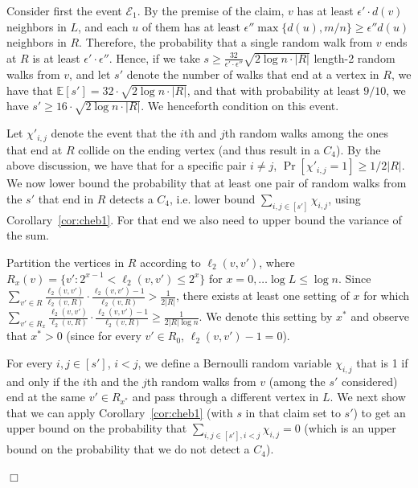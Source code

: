 \documentclass{article}
\newcommand{\eps}{\epsilon}
\newcommand{\Ex}{\mathbb{E}}
\newenvironment{proof}{\smallskip\noindent{\bf Proof:}}%
        {\hspace*{\fill}$\Box$\par}
\begin{document}
\begin{proof}
Consider first the event $\mathcal{E}_1$.
By the premise of the claim, $v$ has at least $\eps'\cdot d(v)$ neighbors in $L$, and each $u$ of them has at least $\eps'' \max\{d(u), m/n\}\geq \eps'' d(u)$ neighbors in $R$. Therefore, 
the probability that a single random walk from $v$ ends at $R$ is at least $\eps'\cdot \eps''$. 
Hence, if we take $s\geq  \frac{32}{\eps' \cdot \eps''}\sqrt{2\log n \cdot |R|}$ length-2 random walks from $v$, and let $s'$ denote the number of  walks that end at a vertex in $R$,  we have that $\Ex[s']=32\cdot \sqrt{2\log n \cdot |R|}$, and that with probability at least $9/10$, we have $s' \geq 16\cdot \sqrt{2\log n \cdot |R|}$. We henceforth condition on this event. 

 Let $\chi'_{i,j}$ denote the event that the $i$th and $j$th random walks among the ones that end at $R$ collide on the ending vertex (and thus result in a $C_4$). By the above discussion, we have that for a specific pair $i\neq j$, $\Pr[\chi'_{i,j}=1]\geq 1/2|R|$. We now  lower bound the probability that at least one pair of random walks from the $s'$ that end in $R$ detects a $C_4$, i.e. lower bound $\sum_{i,j\in[s']}\chi_{i,j}$,  using Corollary~\ref{cor:cheb1}. For that end  we also need to upper bound the variance of the sum. 
 
 Partition the vertices in $R$ according to $\ell_2(v,v')$, where $R_x(v) = \{v': 2^{x-1} < \ell_2(v,v') \leq 2^x\}$
for $x = 0, \dots \log L \leq \log n$.
Since $\sum_{v'\in R} \frac{\ell_2(v,v')}{\ell_2(v,R)}\cdot   \frac{\ell_2(v,v')-1}{\ell_2(v,R)}>\frac{1}{2|R|}$,  there exists at least one setting of $x$ for which
$\sum_{v'\in R_x} \frac{\ell_2(v,v')}{\ell_2(v,R)}\cdot   \frac{\ell_2(v,v')-1}{\ell_2(v,R)} \geq \frac{1}{2|R|\log n}$. We denote this setting by $x^*$ and observe that $x^* > 0$ (since for every $v'\in R_0$, $\ell_2(v,v')-1 =0$).

For every $i,j \in [s']$, $i<j$, we define a Bernoulli random variable $\chi_{i,j}$ that is 1 if and only if the $i$th and the $j$th random walks from $v$ (among the $s'$ considered) end at the same $v'\in R_{x^*}$ and pass through a different vertex in $L$. We next show that we can apply Corollary~\ref{cor:cheb1} (with $s$ in that claim set to $s'$) to get an upper bound on the probability that $\sum_{i,j \in [s'], i<j} \chi_{i,j} = 0$ (which is an upper bound on the probability that we do not detect a $C_4$).


\end{proof}
\end{document}
